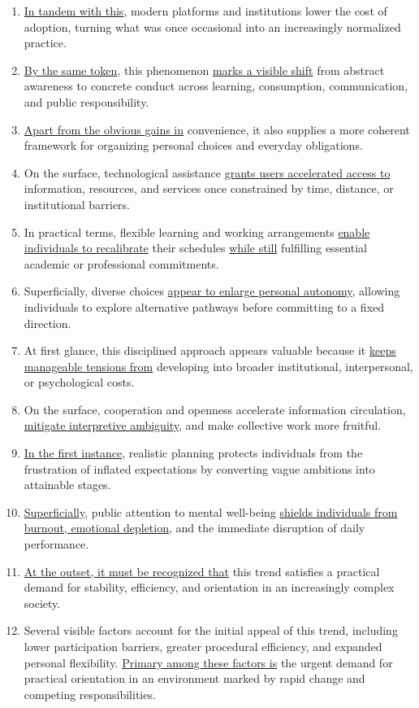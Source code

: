 \begin{enumerate}
    \item \underline{In tandem with this}, modern platforms and institutions lower the cost of adoption, turning what was once occasional into an increasingly normalized practice.
    \item \underline{By the same token}, this phenomenon \underline{marks a visible shift} from abstract awareness to concrete conduct across learning, consumption, communication, and public responsibility.
    \item \underline{Apart from the obvious gains in} convenience, it also supplies a more coherent framework for organizing personal choices and everyday obligations.
    \item On the surface, technological assistance \underline{grants users accelerated access to} information, resources, and services once constrained by time, distance, or institutional barriers.
    \item In practical terms, flexible learning and working arrangements \underline{enable individuals to recalibrate} their schedules \underline{while still} fulfilling essential academic or professional commitments.
    \item Superficially, diverse choices \underline{appear to enlarge personal autonomy}, allowing individuals to explore alternative pathways before committing to a fixed direction.
    \item At first glance, this disciplined approach appears valuable because it \underline{keeps manageable tensions from} developing into broader institutional, interpersonal, or psychological costs.
    \item On the surface, cooperation and openness accelerate information circulation, \underline{mitigate interpretive ambiguity}, and make collective work more fruitful.
    \item \underline{In the first instance}, realistic planning protects individuals from the frustration of inflated expectations by converting vague ambitions into attainable stages.
    \item \underline{Superficially}, public attention to mental well-being \underline{shields individuals from burnout, emotional depletion}, and the immediate disruption of daily performance.
    \item \underline{At the outset, it must be recognized that} this trend satisfies a practical demand for stability, efficiency, and orientation in an increasingly complex society.
    \item Several visible factors account for the initial appeal of this trend, including lower participation barriers, greater procedural efficiency, and expanded personal flexibility. \underline{Primary among these factors is} the urgent demand for practical orientation in an environment marked by rapid change and competing responsibilities.
\end{enumerate}


